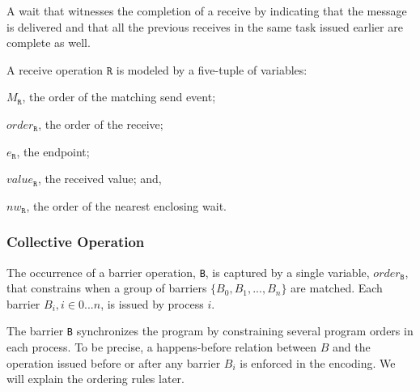 \begin{definition} \label{def:nw}
A wait that witnesses the completion of a receive by indicating that
the message is delivered and that all the previous receives in the
same task issued earlier are complete as well.
\end{definition}

\begin{definition}[Receive] \label{def:rcv}
A receive operation $\mathtt{R}$ is modeled by a five-tuple of variables:
\begin{compactenum}
\item $M_\mathtt{R}$, the order of the matching send event;
\item $\mathit{order}_\mathtt{R}$, the order of the receive;
\item $e_\mathtt{R}$, the endpoint;
\item $\mathit{value}_\mathtt{R}$, the received value; and,
\item $\mathit{nw}_\mathtt{R}$, the order of the nearest enclosing wait.
\end{compactenum}
\end{definition}


\subsubsection{Collective Operation}

\begin{definition}[Barrier]\label{def:barrier}
The occurrence of a barrier operation, \texttt{B}, is captured by a
single variable, $\mathit{order}_\mathtt{B}$, that constrains when a group of barriers $\{B_0, B_1, ..., B_n\}$ are matched.  
Each barrier $B_i, i\in{0 ... n}$, is issued by process $i$. 
\end{definition}


The barrier \texttt{B} synchronizes the program by constraining several program orders in each process. To be precise, a happens-before relation between $B$ and the operation issued before or after any barrier $B_i$ is enforced in the encoding. We will explain the ordering rules later.


